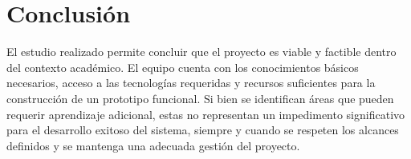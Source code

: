 \section{Conclusión}
El estudio realizado permite concluir que el proyecto es viable y factible dentro del contexto académico. El equipo cuenta con los conocimientos básicos necesarios, acceso a las tecnologías requeridas y recursos suficientes para la construcción de un prototipo funcional. Si bien se identifican áreas que pueden requerir aprendizaje adicional, estas no representan un impedimento significativo para el desarrollo exitoso del sistema, siempre y cuando se respeten los alcances definidos y se mantenga una adecuada gestión del proyecto.
